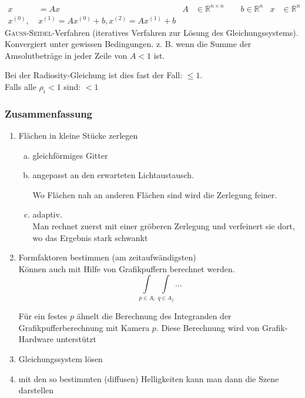 \begin{align*}
 x &= Ax & A &\in \mathbb{R}^{n \times n} \qquad b \in \mathbb{R}^n
	 & x &\in \mathbb{R}^n\\
 x^{(0)}{,}\ & x^{(1)} = A x^{(0)} + b, x^{(2)} = Ax^{(1)} + b
\end{align*}
\textsc{Gauß-Seidel}-Verfahren (iteratives Verfahren zur Lösung des Gleichungssystems). Konvergiert unter gewissen
Bedingungen. z. B. wenn die Summe der Amsolutbeträge in jeder Zeile von $A < 1$ ist.

Bei der Radiosity-Gleichung ist dies fast der Fall: $\le 1$.\\

Falls alle $\rho_i < 1$ sind: $< 1$

\subsubsection{Zusammenfassung}
\begin{enumerate}
 \item Flächen in kleine Stücke zerlegen
	\begin{enumerate}[a)]
	 \item gleichförmiges Gitter
		\begin{center}
		\end{center}
	 \item angepasst an den erwarteten Lichtaustausch.
		\begin{center}
		\end{center}
		Wo Flächen nah an anderen Flächen sind wird die Zerlegung feiner.
	 \item adaptiv.\\
		Man rechnet zuerst mit einer gröberen Zerlegung und verfeinert sie dort, wo das Ergebnis
		stark schwankt
	\end{enumerate}
 \item Formfaktoren bestimmen (am zeitaufwändigsten)\\
	Können auch mit Hilfe von Grafikpuffern berechnet werden.
	\[\int\limits_{p \in A_i} \int\limits_{q \in A_j} ...\]
	\begin{center}
	\end{center}
	Für ein festes $p$ ähnelt die Berechnung des Integranden der Grafikpufferberechnung mit Kamera $p$. Diese
	Berechnung wird von Grafik-Hardware unterstützt
 \item Gleichungssystem lösen
 \item mit den so bestimmten (diffusen) Helligkeiten kann man dann die Szene darstellen
\end{enumerate}

